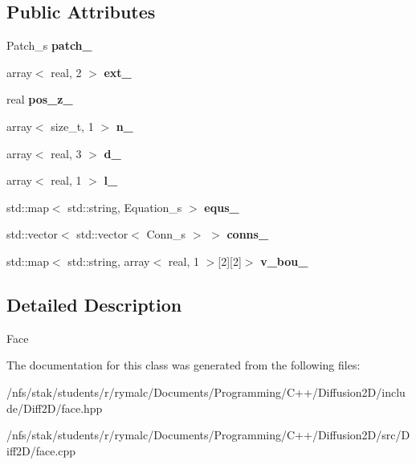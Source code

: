 \subsection*{Public Attributes}
\begin{DoxyCompactItemize}
\item 
\hypertarget{classFace_a2e53c055a4d8492b42995db563e1fc7a}{
Patch\_\-s {\bfseries patch\_\-}}
\label{classFace_a2e53c055a4d8492b42995db563e1fc7a}

\item 
\hypertarget{classFace_a0922668c4175d0274024a5869b310a63}{
array$<$ real, 2 $>$ {\bfseries ext\_\-}}
\label{classFace_a0922668c4175d0274024a5869b310a63}

\item 
\hypertarget{classFace_a639f6d684b3a55d69528b5b6f5976937}{
real {\bfseries pos\_\-z\_\-}}
\label{classFace_a639f6d684b3a55d69528b5b6f5976937}

\item 
\hypertarget{classFace_af798b428f231a2f7fad13a386a5c4d7f}{
array$<$ size\_\-t, 1 $>$ {\bfseries n\_\-}}
\label{classFace_af798b428f231a2f7fad13a386a5c4d7f}

\item 
\hypertarget{classFace_a7d41239f934e8819874b5fb515d43380}{
array$<$ real, 3 $>$ {\bfseries d\_\-}}
\label{classFace_a7d41239f934e8819874b5fb515d43380}

\item 
\hypertarget{classFace_a75033fb2521fcb2c613782f831f42bb3}{
array$<$ real, 1 $>$ {\bfseries l\_\-}}
\label{classFace_a75033fb2521fcb2c613782f831f42bb3}

\item 
\hypertarget{classFace_a46b37a1eaba00ad44cf46b6da1391b30}{
std::map$<$ std::string, Equation\_\-s $>$ {\bfseries equs\_\-}}
\label{classFace_a46b37a1eaba00ad44cf46b6da1391b30}

\item 
\hypertarget{classFace_ac831a8581fa641c54f4adb6e6b3dfe71}{
std::vector$<$ std::vector$<$ Conn\_\-s $>$ $>$ {\bfseries conns\_\-}}
\label{classFace_ac831a8581fa641c54f4adb6e6b3dfe71}

\item 
\hypertarget{classFace_a982045b07b690ea86fc8faa77a1cc534}{
std::map$<$ std::string, array$<$ real, 1 $>$\mbox{[}2\mbox{]}\mbox{[}2\mbox{]}$>$ {\bfseries v\_\-bou\_\-}}
\label{classFace_a982045b07b690ea86fc8faa77a1cc534}

\end{DoxyCompactItemize}


\subsection{Detailed Description}
Face 

The documentation for this class was generated from the following files:\begin{DoxyCompactItemize}
\item 
/nfs/stak/students/r/rymalc/Documents/Programming/C++/Diffusion2D/include/Diff2D/face.hpp\item 
/nfs/stak/students/r/rymalc/Documents/Programming/C++/Diffusion2D/src/Diff2D/face.cpp\end{DoxyCompactItemize}
